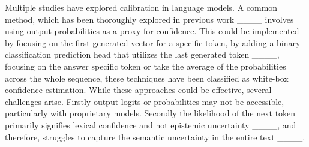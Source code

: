 



Multiple studies have explored calibration in language models. A common method, which has been thoroughly explored in previous work ____ involves using output probabilities as a proxy for confidence. This could be implemented by focusing on the first generated vector for a specific token, by adding a binary classification prediction head that utilizes the last generated token ____, focusing on the answer specific token or take the average of the probabilities across the whole sequence, these techniques have been classified as white-box confidence estimation. While these approaches could be effective, several challenges arise. Firstly output logits or probabilities may not be accessible, particularly with proprietary models. Secondly the likelihood of the next token primarily signifies lexical confidence and not epistemic uncertainty ____, and therefore, struggles to capture the semantic uncertainty in the entire text ____. 

